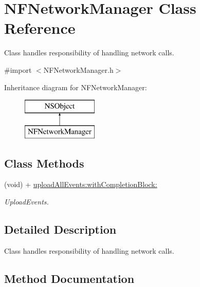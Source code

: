 \hypertarget{interface_n_f_network_manager}{}\section{N\+F\+Network\+Manager Class Reference}
\label{interface_n_f_network_manager}


Class handles responsibility of handling network calls.  




{\ttfamily \#import $<$N\+F\+Network\+Manager.\+h$>$}

Inheritance diagram for N\+F\+Network\+Manager\+:\begin{figure}[H]
\begin{center}
\leavevmode
\includegraphics[height=2.000000cm]{interface_n_f_network_manager}
\end{center}
\end{figure}
\subsection*{Class Methods}
\begin{DoxyCompactItemize}
\item 
(void) + \hyperlink{interface_n_f_network_manager_a146f3a7713b9e65ecb007318cdc7a99c}{upload\+All\+Events\+:with\+Completion\+Block\+:}
\begin{DoxyCompactList}\small\item\em Upload\+Events. \end{DoxyCompactList}\end{DoxyCompactItemize}


\subsection{Detailed Description}
Class handles responsibility of handling network calls. 

\subsection{Method Documentation}
\mbox{\label{interface_n_f_network_manager_a146f3a7713b9e65ecb007318cdc7a99c}} 
